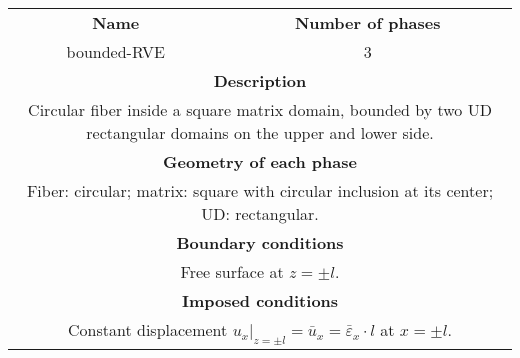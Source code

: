 \begin{table}[htbp]
\footnotesize
  \centering
  \small
    \begin{tabularx}{\textwidth}{cc}
    \toprule
   \midrule
    \textbf{Name} & \textbf{Number of phases}\\
     bounded-RVE&3\\
    \midrule
    \multicolumn{2}{X}{\textbf{Description}}\\
    \multicolumn{2}{X}{Circular fiber inside a square matrix domain, bounded by two UD rectangular domains on the upper and lower side.}\\
    \midrule
    \multicolumn{2}{X}{\textbf{Geometry of each phase}}\\
    \multicolumn{2}{X}{Fiber: circular; matrix: square with circular inclusion at its center; UD: rectangular.}\\
    \midrule
    \multicolumn{2}{X}{\textbf{Boundary conditions}}\\
    \multicolumn{2}{X}{Free surface at $z=\pm l$.}\\
    \midrule
    \multicolumn{2}{X}{\textbf{Imposed conditions}}\\
    \multicolumn{2}{X}{Constant displacement $u_{x}|_{z=\pm l}=\bar{u}_{x}=\bar{\varepsilon}_{x}\cdot l$ at $x=\pm l$.}\\
    \midrule
    \bottomrule
    \end{tabularx}%
  \label{tab:geom_tab2}%
\end{table}%